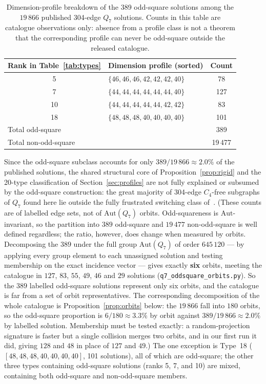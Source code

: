 \documentclass[12pt,a4paper]{article}
\theoremstyle{definition}
\begin{document}
\begin{table}[ht]
\centering
\caption{Dimension-profile breakdown of the 389 odd-square solutions among
  the $19\,866$ published 304-edge $Q_7$ solutions. Counts in this table are
  catalogue observations only: absence from a profile class is not a theorem
  that the corresponding profile can never be odd-square outside the released
  catalogue.}
\label{tab:oddsquareaudit}\medskip
\begin{tabular}{clc}
\toprule
Rank in Table~\ref{tab:types} & Dimension profile (sorted) & Count\\
\midrule
 5 & $\{46,46,46,42,42,42,40\}$ & 78\\
 7 & $\{44,44,44,44,44,44,40\}$ & 127\\
10 & $\{44,44,44,44,44,42,42\}$ & 83\\
18 & $\{48,48,48,40,40,40,40\}$ & 101\\
\midrule
\multicolumn{2}{l}{Total odd-square} & 389\\
\multicolumn{2}{l}{Total non-odd-square} & 19\,477\\
\bottomrule
\end{tabular}
\end{table}

Since the odd-square subclass accounts for only $389/19\,866\approx2.0\%$ of
the published solutions, the shared structural core of
Proposition~\ref{prop:rigid} and the 20-type classification of
Section~\ref{sec:profiles} are not fully explained or subsumed by
the odd-square construction: the great majority of 304-edge $C_4$-free
subgraphs of $Q_7$ found here lie outside the fully frustrated switching
class of~\cite{DPTV79}. (These counts are of labelled edge sets, not of $\mathrm{Aut}(Q_7)$ orbits.
Odd-squareness is $\mathrm{Aut}$-invariant, so the partition into $389$
odd-square and $19\,477$ non-odd-square is well defined regardless; the ratio,
however, does change when measured by orbits. Decomposing the $389$ under the
full group $\mathrm{Aut}(Q_7)$ of order $645\,120$ --- by applying every group
element to each unassigned solution and testing membership on the exact
incidence vector --- gives exactly \textbf{six} orbits, meeting the catalogue in
$127$, $83$, $55$, $49$, $46$ and $29$ solutions
(\texttt{q7\_oddsquare\_orbits.py}). So the $389$ labelled odd-square solutions
represent only six orbits, and the catalogue is far from a set of orbit
representatives. The corresponding decomposition of the whole catalogue is
Proposition~\ref{prop:orbits} below: the $19\,866$ fall into $180$ orbits, so
the odd-square proportion is $6/180\approx3.3\%$ by orbit against
$389/19\,866\approx2.0\%$ by labelled solution. Membership must be tested exactly: a
random-projection signature is faster but a single collision merges two orbits,
and in our first run it did, giving $128$ and $48$ in place of $127$ and $49$.) The one exception is Type~18
($[48,48,48,40,40,40,40]$, 101 solutions), all of which are odd-square;
the other three types containing odd-square solutions (ranks 5, 7, and
10) are mixed, containing both odd-square and non-odd-square members.
\end{document}
